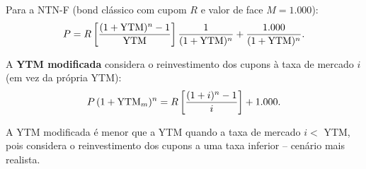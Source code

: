 Para a NTN-F (bond clássico com cupom $R$ e valor de face $M = 1{.}000$):
\[
  P = R\left[\frac{(1+\mathrm{YTM})^n-1}{\mathrm{YTM}}\right]\frac{1}{(1+\mathrm{YTM})^n}
    + \frac{1{.}000}{(1+\mathrm{YTM})^n}.
\]

A \textbf{YTM modificada} considera o reinvestimento dos cupons à taxa de mercado $i$
(em vez da própria YTM):
\[
  P\,(1+\mathrm{YTM}_m)^n = R\left[\frac{(1+i)^n-1}{i}\right] + 1{.}000.
\]

\begin{nota}
A YTM modificada é menor que a YTM quando a taxa de mercado $i <$ YTM, pois considera
o reinvestimento dos cupons a uma taxa inferior -- cenário mais realista.
\end{nota}
